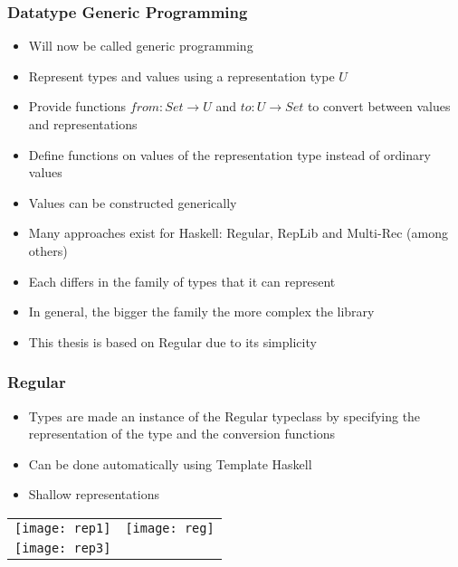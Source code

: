 \documentclass{beamer}
\begin{document}
\begin{frame}

  \frametitle{Datatype Generic Programming}
  \begin{itemize}
  \item Will now be called generic programming
  \item Represent types and values using a representation type $U$
  \item Provide functions $from : Set \rightarrow U$ and $to : U
    \rightarrow Set$ to convert between values and representations
  \item Define functions on values of the representation type instead
    of ordinary values
  \item Values can be constructed generically
  \item Many approaches exist for Haskell: Regular, RepLib and
    Multi-Rec (among others)
  \item Each differs in the family of types that it can represent
  \item In general, the bigger the family the more complex the library
  \item This thesis is based on Regular due to its simplicity
  \end{itemize}
  
\end{frame}

\begin{frame}
  \frametitle{Regular}

  \begin{itemize}
    \item Types are made an instance of the Regular typeclass by
      specifying the representation of the type and the conversion
      functions
    \item Can be done automatically using Template Haskell
    \item Shallow representations
  \end{itemize}
  
  \begin{tabular}{ll}
    \texttt{[image: rep1]} & \texttt{[image: reg]} \\
    \texttt{[image: rep3]} & \\
  \end{tabular}
\end{frame}
\end{document}
